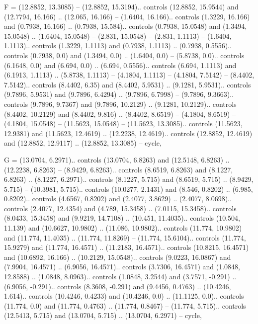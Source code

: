 F = {(12.8852, 13.3085) -- (12.8852, 15.3194).. controls (12.8852, 15.9544) and (12.7794, 16.166) .. (12.065, 16.166) -- (1.6404, 16.166).. controls (1.3229, 16.166) and (0.7938, 16.166) .. (0.7938, 15.584).. controls (0.7938, 15.0548) and (1.3494, 15.0548) .. (1.6404, 15.0548) -- (2.831, 15.0548) -- (2.831, 1.1113) -- (1.6404, 1.1113).. controls (1.3229, 1.1113) and (0.7938, 1.1113) .. (0.7938, 0.5556).. controls (0.7938, 0.0) and (1.3494, 0.0) .. (1.6404, 0.0) -- (5.8738, 0.0).. controls (6.1648, 0.0) and (6.694, 0.0) .. (6.694, 0.5556).. controls (6.694, 1.1113) and (6.1913, 1.1113) .. (5.8738, 1.1113) -- (4.1804, 1.1113) -- (4.1804, 7.5142) -- (8.4402, 7.5142).. controls (8.4402, 6.35) and (8.4402, 5.9531) .. (9.1281, 5.9531).. controls (9.7896, 5.9531) and (9.7896, 6.4294) .. (9.7896, 6.7998) -- (9.7896, 9.3663).. controls (9.7896, 9.7367) and (9.7896, 10.2129) .. (9.1281, 10.2129).. controls (8.4402, 10.2129) and (8.4402, 9.816) .. (8.4402, 8.6519) -- (4.1804, 8.6519) -- (4.1804, 15.0548) -- (11.5623, 15.0548) -- (11.5623, 13.3085).. controls (11.5623, 12.9381) and (11.5623, 12.4619) .. (12.2238, 12.4619).. controls (12.8852, 12.4619) and (12.8852, 12.9117) .. (12.8852, 13.3085) -- cycle},

G = {(13.0704, 6.2971).. controls (13.0704, 6.8263) and (12.5148, 6.8263) .. (12.2238, 6.8263) -- (8.9429, 6.8263).. controls (8.6519, 6.8263) and (8.1227, 6.8263) .. (8.1227, 6.2971).. controls (8.1227, 5.715) and (8.6519, 5.715) .. (8.9429, 5.715) -- (10.3981, 5.715).. controls (10.0277, 2.1431) and (8.546, 0.8202) .. (6.985, 0.8202).. controls (4.6567, 0.8202) and (2.4077, 3.8629) .. (2.4077, 8.0698).. controls (2.4077, 12.4354) and (4.789, 15.3458) .. (7.0115, 15.3458).. controls (8.0433, 15.3458) and (9.9219, 14.7108) .. (10.451, 11.4035).. controls (10.504, 11.139) and (10.6627, 10.9802) .. (11.086, 10.9802).. controls (11.774, 10.9802) and (11.774, 11.4035) .. (11.774, 11.8269) -- (11.774, 15.6104).. controls (11.774, 15.9279) and (11.774, 16.4571) .. (11.2183, 16.4571).. controls (10.8215, 16.4571) and (10.6892, 16.166) .. (10.2129, 15.0548).. controls (9.0223, 16.0867) and (7.9904, 16.4571) .. (6.9056, 16.4571).. controls (3.7306, 16.4571) and (1.0848, 12.8588) .. (1.0848, 8.0963).. controls (1.0848, 3.2544) and (3.7571, -0.291) .. (6.9056, -0.291).. controls (8.3608, -0.291) and (9.4456, 0.4763) .. (10.4246, 1.614).. controls (10.4246, 0.4233) and (10.4246, 0.0) .. (11.1125, 0.0).. controls (11.774, 0.0) and (11.774, 0.4763) .. (11.774, 0.8467) -- (11.774, 5.715).. controls (12.5413, 5.715) and (13.0704, 5.715) .. (13.0704, 6.2971) -- cycle},

